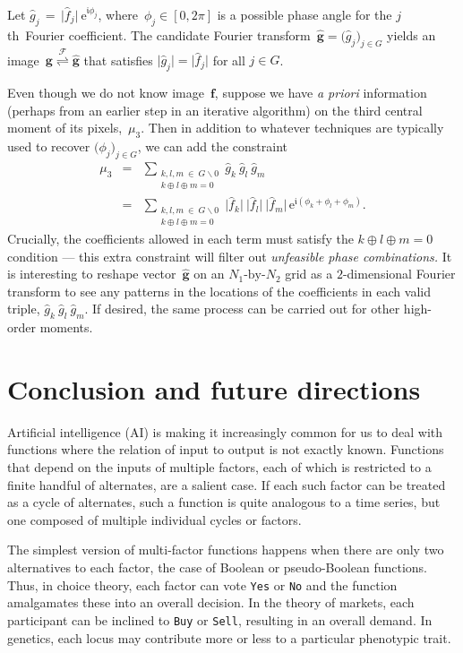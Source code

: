 \documentclass[letterpaper,11pt]{article}
\newcommand{\bs}[1]{{\boldsymbol{#1}}}
\newcommand{\gr}[1]{( #1 )}
\newcommand{\Gr}[1]{\big( #1 \big)}
\newcommand{\abs}[1]{\vert #1 \vert}
\newcommand{\vect}[1]{[ #1 ]}
\newcommand{\e}{\mathrm{e}} %
\newcommand{\bcode}[1]{\texttt{#1}}
\newcommand{\imag}{\mathfrak{i}}
\newcommand{\jth}{$j$th}
\theoremstyle{definition} \newtheorem{remark}{Remark}
\begin{document}
Let $\hat{g}_j \,=\, \abs{\hat{f}_j} \:\! \e^{\imag\phi_j}$, where~$\phi_j\in\vect{0,2\pi}$ is a possible phase angle for the \jth\ Fourier coefficient. The candidate Fourier transform~$\hat{\bs{g}} = \Gr{\hat{g}_j}_{j\in G}$ yields an image~$\bs{g} \stackrel{\mathcal{F}}\rightleftharpoons \hat{\bs{g}}$ that satisfies $\abs{\hat{g}_j} = \abs{\hat{f}_j}$ for all $j\in G$.

Even though we do not know image~$\bs{f}$, suppose we have \emph{a priori} information (perhaps from an earlier step in an iterative algorithm) on the third central moment of its pixels,~$\mu_3$. Then in addition to whatever techniques are typically used to recover $\Gr{\phi_j}_{j\in G}$, we can add the constraint
\begin{eqnarray*}
\mu_3 &=&
    \sum_{\substack{k,l,m\:\!\in\:\!G\backslash0\\[2pt] k \oplus l \oplus m = 0}}
   \hat{g}_k \:\! \hat{g}_l \:\! \hat{g}_m \\[5pt]
&=&
    \sum_{\substack{k,l,m\:\!\in\:\!G\backslash0\\[2pt] k \oplus l \oplus m = 0}} \abs{\hat{f}_k} \:\! \abs{\hat{f}_l} \:\! \abs{\hat{f}_m} \, \e^{\imag\gr{\phi_k + \phi_l + \phi_m}}.
\end{eqnarray*}
Crucially, the coefficients allowed in each term must satisfy the {$k \oplus l \oplus m = 0$} condition --- this extra constraint will filter out \emph{unfeasible phase combinations.} It is interesting to reshape vector~$\hat{\bs{g}}$ on an $N_1\text{-by-}N_2$ grid as a $2$-dimensional Fourier transform to see any patterns in the locations of the coefficients in each valid triple, $\hat{g}_k \:\! \hat{g}_l \:\! \hat{g}_m$. If desired, the same process can be carried out for other high-order moments.


\section{Conclusion and future directions} \label{Sec:Conclusion}
Artificial intelligence (AI) is making it increasingly common for us to deal with functions where the relation of input to output is not exactly known. Functions that depend on the inputs of multiple factors, each of which is restricted to a finite handful of alternates, are a salient case. If each such factor can be treated as a cycle of alternates, such a function is quite analogous to a time series, but one composed of multiple individual cycles or factors.

The simplest version of multi-factor functions happens when there are only two alternatives to each factor, the case of Boolean or pseudo-Boolean functions. Thus, in choice theory, each factor can vote \bcode{Yes} or \bcode{No} and the function amalgamates these into an overall decision. In the theory of markets, each participant can be inclined to \bcode{Buy} or \bcode{Sell}, resulting in an overall demand. In genetics, each locus may contribute more or less to a particular phenotypic trait.
\end{document}
